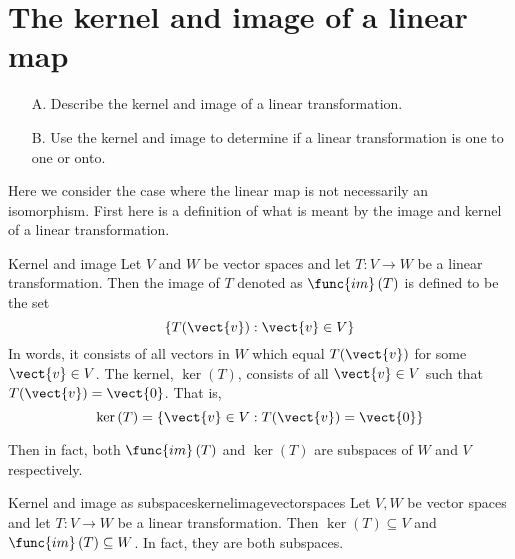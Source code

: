 \section{The kernel and image of a linear map}

\begin{outcome}
\begin{enumerate}
\item[A.] Describe the kernel and image of a linear transformation.

\item[B.] Use the kernel and image to determine if a linear transformation is one to one or onto. 
\end{enumerate}
\end{outcome}

Here we consider the case where the linear map is not necessarily an
isomorphism. First here is a definition of what is meant by the image and
kernel of a linear transformation.

\begin{definition}{Kernel and image}{}
Let $V$ and $W$ be vector spaces and let $T:V\rightarrow W$ be a linear transformation. Then the image of $T$
denoted as $\func{im}\left( T\right) $ is defined to be the set 
\begin{equation*}
\left\{ T(\vect{v}):\vect{v}\in V\right\}
\end{equation*}
In words, it consists of all vectors in $W$ which equal $T(\vect{v})$ for some $
\vect{v}\in V$. The kernel, $\ker \left( T\right) $, 
consists of all $\vect{v}\in V$ such that $T(\vect{v})=\vect{0}$. That is, 
\begin{equation*}
\ker \left( T\right) =\left\{ \vect{v}\in V:T(\vect{v})=\vect{0}\right\}
\end{equation*}
\end{definition}

Then in fact, both $\func{im}\left( T\right) $ and $\ker \left( T\right) $
are subspaces of $W$ and $V$ respectively.

\begin{proposition}{Kernel and image as subspaces}{kernelimagevectorspaces}
Let $V,W$ be vector spaces and let $T:V\rightarrow W$ be a linear transformation. Then $\ker \left(
T\right) \subseteq V$ and $\func{im}\left( T\right) \subseteq W$. In fact, they are both subspaces. 
\end{proposition}

